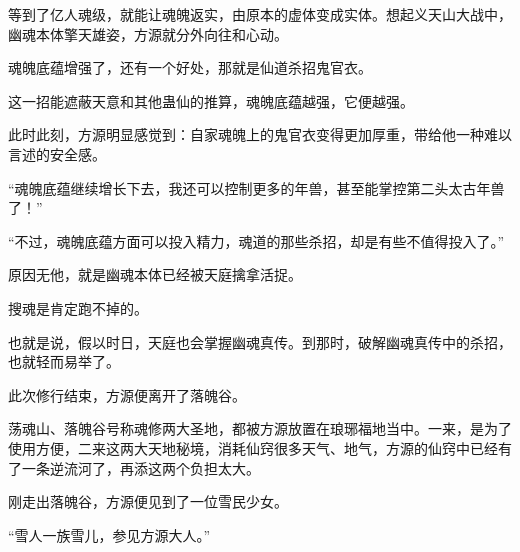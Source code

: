 \begin{this_body}
等到了亿人魂级，就能让魂魄返实，由原本的虚体变成实体。想起义天山大战中，幽魂本体擎天雄姿，方源就分外向往和心动。

魂魄底蕴增强了，还有一个好处，那就是仙道杀招鬼官衣。

这一招能遮蔽天意和其他蛊仙的推算，魂魄底蕴越强，它便越强。

此时此刻，方源明显感觉到：自家魂魄上的鬼官衣变得更加厚重，带给他一种难以言述的安全感。

“魂魄底蕴继续增长下去，我还可以控制更多的年兽，甚至能掌控第二头太古年兽了！”

“不过，魂魄底蕴方面可以投入精力，魂道的那些杀招，却是有些不值得投入了。”

原因无他，就是幽魂本体已经被天庭擒拿活捉。

搜魂是肯定跑不掉的。

也就是说，假以时日，天庭也会掌握幽魂真传。到那时，破解幽魂真传中的杀招，也就轻而易举了。

此次修行结束，方源便离开了落魄谷。

荡魂山、落魄谷号称魂修两大圣地，都被方源放置在琅琊福地当中。一来，是为了使用方便，二来这两大天地秘境，消耗仙窍很多天气、地气，方源的仙窍中已经有了一条逆流河了，再添这两个负担太大。

刚走出落魄谷，方源便见到了一位雪民少女。

“雪人一族雪儿，参见方源大人。”

\end{this_body}

